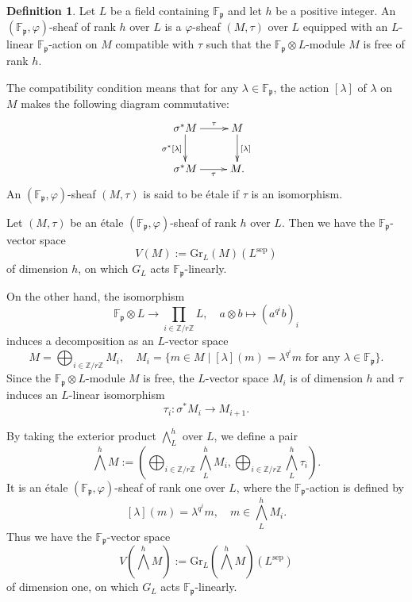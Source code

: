 \documentclass[10pt]{amsart}
\theoremstyle{plain}
\theoremstyle{definition}
\newtheorem{dfn}[thm]{Definition}
\newcommand{\sep}{\mathrm{sep}}
\newcommand{\Gr}{\mathrm{Gr}}
\newcommand{\bF}{\mathbb{F}}
\newcommand{\bZ}{\mathbb{Z}}
\newcommand{\frp}{\mathfrak{p}}
\begin{document}
\begin{dfn}
	Let $L$ be a field containing $\bF_\frp$ and let $h$ be a positive integer.
	An $(\bF_\frp,\varphi)$-sheaf of rank $h$ over $L$ is a $\varphi$-sheaf $(M,\tau)$ over $L$ 
	equipped with an $L$-linear $\bF_\frp$-action on $M$ 
	compatible with $\tau$ such that the $\bF_\frp\otimes L$-module $M$ is free of rank $h$.
	
	The compatibility condition means that for any $\lambda\in \bF_\frp$, the action $[\lambda]$ of $\lambda$ on $M$ makes the following 
	diagram commutative:
	\[
	\xymatrix{
		\sigma^* M \ar[r]^-{\tau}\ar[d]_{\sigma^*[\lambda]} & M \ar[d]^{[\lambda]}\\
		\sigma^* M\ar[r]_-{\tau} & M.
	}
	\]
	An $(\bF_\frp,\varphi)$-sheaf $(M,\tau)$ is said to be \'{e}tale if $\tau$ is an isomorphism.
\end{dfn}

Let $(M,\tau)$ be an \'{e}tale $(\bF_\frp,\varphi)$-sheaf of rank $h$ over $L$. Then we have the $\bF_\frp$-vector space
\[
V(M):=\Gr_L(M)(L^\sep)
\]
of dimension $h$, on which $G_L$ acts $\bF_\frp$-linearly. 

On the other hand, the isomorphism
\begin{equation}\label{EqnFpKDecomp}
\bF_{\frp}\otimes L\to \prod_{i\in \bZ/r\bZ}L, \quad a\otimes b\mapsto (a^{q^i}b)_i
\end{equation}
induces a decomposition as an $L$-vector space
\begin{equation}\label{EqnDecompM}
	M=\bigoplus_{i\in \bZ/r\bZ}M_i,\quad M_i=\{m\in M\mid [\lambda](m)=\lambda^{q^i} m\text{ for any }\lambda\in \bF_\frp\}.
\end{equation}
Since the $\bF_\frp\otimes L$-module $M$ is free, the $L$-vector space $M_i$ is of dimension $h$ and $\tau$ induces an
$L$-linear isomorphism
\[
\tau_i:\sigma^* M_i\to M_{i+1}.
\] 

By taking the exterior product $\bigwedge^h_L$ over $L$, we define a pair
\[
\bigwedge^h M:=(\bigoplus_{i\in \bZ/r\bZ} \bigwedge^h_L M_i,\bigoplus_{i\in \bZ/r\bZ}  \bigwedge^h_L\tau_{i}).
\]
It is an \'{e}tale $(\bF_\frp,\varphi)$-sheaf of rank one over $L$,
where the $\bF_\frp$-action is defined by
\[
[\lambda](m)=\lambda^{q^i}m,\quad m\in \bigwedge^h_L M_i.
\]
Thus we have the $\bF_\frp$-vector space
\[
V(\bigwedge^h M):=\Gr_L(\bigwedge^h M)(L^\sep)
\]
of dimension one, on which $G_L$ acts $\bF_\frp$-linearly.
\end{document}
